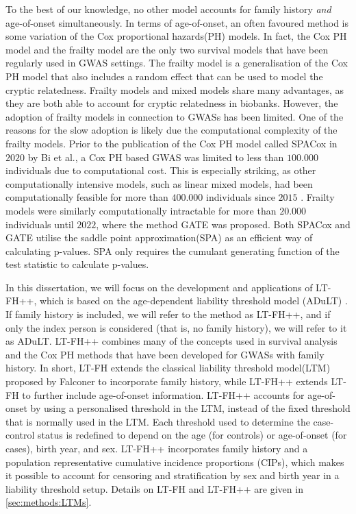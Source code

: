 To the best of our knowledge, no other model accounts for family history \textit{and} age-of-onset simultaneously. In terms of age-of-onset, an often favoured method is some variation of the Cox proportional hazards(PH) models. In fact, the Cox PH model and the frailty model are the only two survival models that have been regularly used in GWAS settings\cite{bi2020fast,dey2022efficient}. The frailty model is a generalisation of the Cox PH model that also includes a random effect that can be used to model the cryptic relatedness. Frailty models and mixed models share many advantages, as they are both able to account for cryptic relatedness in biobanks. However, the adoption of frailty models in connection to GWASs has been limited. One of the reasons for the slow adoption is likely due the computational complexity of the frailty models. Prior to the publication of the Cox PH model called SPACox in $ 2020 $ by Bi et al., a Cox PH based GWAS was limited to less than $ 100.000 $ individuals due to computational cost\cite{bi2020fast}. This is especially striking, as other computationally intensive models, such as linear mixed models, had been computationally feasible for more than $ 400.000 $ individuals since $ 2015 $ \cite{loh2015efficient}. Frailty models were similarly computationally intractable for more than $ 20.000 $ individuals until $ 2022 $, where the method GATE was proposed\cite{dey2022efficient}. Both SPACox and GATE utilise the saddle point approximation(SPA) as an efficient way of calculating p-values. SPA only requires the cumulant generating function of the test statistic to calculate p-values.

In this dissertation, we will focus on the development and applications of LT-FH++, which is based on the age-dependent liability threshold model (ADuLT) \cite{pedersen2022adult}. If family history is included, we will refer to the method as LT-FH++, and if only the index person is considered (that is, no family history), we will refer to it as ADuLT. LT-FH++ combines many of the concepts used in survival analysis and the Cox PH methods that have been developed for GWASs with family history. In short, LT-FH extends the classical liability threshold model(LTM) proposed by Falconer\cite{falconer1965inheritance,falconer1967inheritance} to incorporate family history, while LT-FH++ extends LT-FH to further include age-of-onset information. LT-FH++ accounts for age-of-onset by using a personalised threshold in the LTM, instead of the fixed threshold that is normally used in the LTM. Each threshold used to determine the case-control status is redefined to depend on the age (for controls) or age-of-onset (for cases), birth year, and sex. LT-FH++ incorporates family history and a population representative cumulative incidence proportions (CIPs), which makes it possible to account for censoring and stratification by sex and birth year in a liability threshold setup. Details on LT-FH and LT-FH++ are given in \cref{sec:methods:LTMs}.

